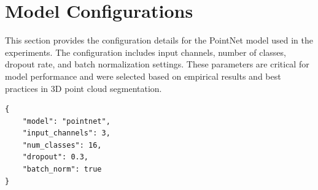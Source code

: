 \documentclass[12pt,a4paper]{report}
\begin{document}
\newpage
\section*{Model Configurations}
This section provides the configuration details for the PointNet model used in the experiments. The configuration includes input channels, number of classes, dropout rate, and batch normalization settings.
These parameters are critical for model performance and were selected based on empirical results and best practices in 3D point cloud segmentation.
\begin{lstlisting}
{
    "model": "pointnet",
    "input_channels": 3,
    "num_classes": 16,
    "dropout": 0.3,
    "batch_norm": true
}
\end{lstlisting}

\end{document}
